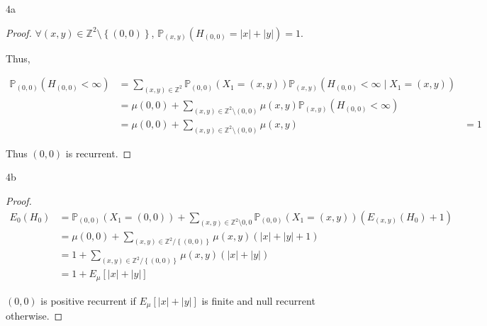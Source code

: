\documentclass{article}
\newcommand{\PR}{\mathbb{P}}
\newcommand{\Z}{\mathbb{Z}}
\newcommand{\abs}[1]{\left\lvert #1\right\rvert}
\begin{document}
\bigskip

\begin{PROB}{4a}\label{Problem 4a.}
\end{PROB}
\begin{proof}
    $\forall (x, y) \in \Z^2 \setminus \left\{ (0, 0) \right\}$, $\PR_{(x, y)}(H_{(0, 0)} = \abs{x} + \abs{y}) = 1$. 
    
    Thus, 
    
    \begin{align*}
        \PR_{(0, 0)}(H_{(0,0)} < \infty) &= \sum_{(x, y) \in \Z^2} \PR_{(0, 0)}(X_1 = (x, y)) \PR_{(x, y)}(H_{(0, 0)} < \infty \mid X_1 = (x, y)) \\
        &= \mu(0,0) + \sum_{(x, y) \in \Z^2 \setminus {(0, 0)}} \mu(x, y) \PR_{(x, y)}(H_{(0, 0)} < \infty) \\
        &= \mu(0,0) + \sum_{(x, y) \in \Z^2 \setminus {(0, 0)}} \mu(x, y) 
        &= 1
    \end{align*}
    
    Thus $(0 ,0)$ is recurrent.  
\end{proof}

\begin{PROB}{4b}\label{Problem 4b.}
\end{PROB}
\begin{proof}
    \begin{align*}
        E_0(H_0) &= \PR_{(0, 0)}(X_1 = (0, 0)) + \sum_{(x, y) \in \Z^2 \setminus {0, 0}} \PR_{(0, 0)}(X_1 = (x, y))\left(E_{(x, y)}(H_0) + 1\right) \\
        &= 
        \mu(0, 0) + \sum_{(x, y) \in \Z^2 / \left\{ (0, 0) \right\}} \mu(x, y)(\abs{x} + \abs{y} + 1) \\
        &= 1 + \sum_{(x, y) \in \Z^2 / \left\{ (0, 0) \right\}} \mu(x, y)(\abs{x} + \abs{y}) \\
        &= 1 + E_\mu[\abs{x} + \abs{y}]
    \end{align*}

    $(0,0)$ is positive recurrent if $E_\mu[\abs{x} + \abs{y}]$ is finite and null recurrent otherwise.   
\end{proof}
\end{document}
